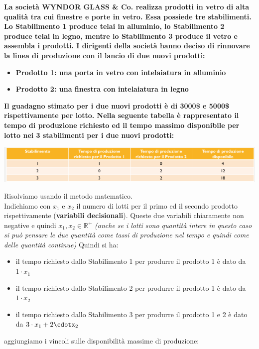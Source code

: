\documentclass[a4paper,12pt, oneside]{book}
\begin{document}
\begin{esempio}
  \textbf{La società WYNDOR GLASS & Co. realizza prodotti in vetro di
    alta qualità tra cui finestre e porte in vetro. Essa possiede tre
    stabilimenti. Lo Stabilimento 1 produce telai in alluminio, lo
    Stabilimento 2 produce telai in legno, mentre lo Stabilimento 3
    produce il vetro e assembla i prodotti. I dirigenti della società
    hanno deciso di rinnovare la linea di produzione con il lancio di
    due nuovi prodotti:}
  \begin{itemize}
    \item \textbf{Prodotto 1: una porta in vetro con intelaiatura in
      alluminio}
    \item \textbf{Prodotto 2: una finestra con intelaiatura in legno}
  \end{itemize}
  \textbf{Il guadagno stimato per i due nuovi prodotti è di 3000\$ e
    5000\$ rispettivamente per lotto. Nella seguente tabella è
    rappresentato il tempo di produzione richiesto ed il tempo massimo
    disponibile per lotto nei 3 stabilimenti per i due nuovi
    prodotti:}
  \begin{center}
    \includegraphics[scale = 0.7]{img/3d6.png}
  \end{center}
  Risolviamo usando il metodo matematico.\\
  Indichiamo con $x_1$ e $x_2$ il numero di lotti per il primo ed il
  secondo prodotto rispettivamente (\textbf{variabili
    decisionali}). Queste due variabili chiaramente non negative e
  quindi $x_1,x_2\in \mathbb{R}^+$ \textit{(anche se i lotti sono
    quantità intere in questo caso si può pensare le due quantità
    come tassi di produzione nel tempo e quindi come delle quantità
    continue)}
  Quindi si ha:
  \begin{itemize}
    \item il tempo richiesto dallo Stabilimento 1 per produrre il
    prodotto 1 è dato da $1\cdot x_1$
    \item il tempo richiesto dallo Stabilimento 2 per produrre il
    prodotto 1 è dato da $1\cdot x_2$
    \item il tempo richiesto dallo Stabilimento 3 per produrre il
    prodotto 1 e 2 è dato da $3\cdot x_1+2\cdotx_2$
  \end{itemize}
  aggiungiamo i vincoli sulle disponibilità massime di produzione:

\end{esempio}
\end{document}
